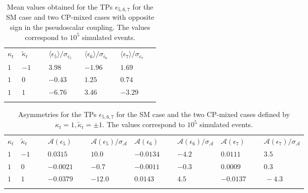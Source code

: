 \documentclass[aps,preprint,tightenlines,floatfix,superscriptaddress,nofootinbib,showpacs]{revtex4-1}
\def\kp{\kappa_t}
\def\kpt{\tilde{\kappa}_t}
\begin{document}
\begin{table}[H]
\caption{Mean values obtained for the TPs $\epsilon_{5,6,7}$ for the
  SM case and two $\mathrm{CP}$-mixed cases with opposite sign in the
  pseudoscalar coupling. The values correspond to $10^5$ simulated
  events.}
\label{table6}
\begin{center}
\begin{tabular}{|C{1cm}|C{1cm}||C{2cm}||C{2cm}||C{2cm}|}
\hhline{|-----|}
$\kappa_t$ & $\tilde{\kappa}_t$ & $\langle \epsilon_5 \rangle /\sigma_{\bar{\epsilon}_5}$ & $\langle \epsilon_6 \rangle /\sigma_{\bar{\epsilon}_6}$ & $\langle \epsilon_7 \rangle /\sigma_{\bar{\epsilon}_7}$ \\ 
\hhline{|=====|} 
\renewcommand{\arraystretch}{1.0}
$1$~ & $-1$~~~ & $3.98$~ & $-1.96$~~~ & $1.69$~ \\[0.6mm]
\hline
$1$ & $0$~ & $-0.43$~~~ & $1.25$~ & $0.74$~ \\[0.6mm]
\hline
$1$ & $1$~ & $-6.76$~~~ & $3.46$~ & $-3.29$~~~~\\[0.6mm]
\hhline{|=====|}
\end{tabular}
\end{center} 
\end{table}
\renewcommand{\arraystretch}{1.4}
\begin{table}[H]
\caption{Asymmetries for the TPs $\epsilon_{5,6,7}$ for the SM case
  and the two $\mathrm{CP}$-mixed cases defined by $\kp=1,\kpt=\pm
  1$. The values correspond to $10^5$ simulated events.}
\label{table7}
\begin{center}
\begin{tabular}{|C{1cm}|C{1cm}||C{2cm}|C{2cm}||C{2cm}|C{2cm}||C{2cm}|C{2cm}|}
\hhline{|========|}
$\kappa_t$&$\tilde{\kappa}_t$~~&$\mathcal{A}(\epsilon_5)$~~&$\mathcal{A}(\epsilon_5)/\sigma_{\mathcal{A}}$& $\mathcal{A}(\epsilon_6)$~~&$\mathcal{A}(\epsilon_6)/\sigma_{\mathcal{A}}$&$\mathcal{A}(\epsilon_7)$~~&$\mathcal{A}(\epsilon_7)/\sigma_{\mathcal{A}}$  \\ 
\hhline{|========|} 
$1$ & $-1$~~~ & $0.0315$~ & $10.0$~ & $-0.0134$~~~ & $-4.2$~~~ & $0.0111$~ & $3.5$~\\[0.6mm]
\hline
$1$ & $0$ & $-0.0021$~~~ & $-0.7$~~~ & $-0.0011$~~~ & $-0.3$~~~ & $0.0009$~& $0.3$~\\[0.6mm]
\hline
$1$ & $1$ & $-0.0379$~~~ & $-12.0$~~~ & $0.0143$~ & $4.5$~ & $-0.0137$~~~ & $\,-4.3$~~~  \\[0.6mm]
\hhline{|========|}
\end{tabular}
\end{center} 
\end{table}
\end{document}
